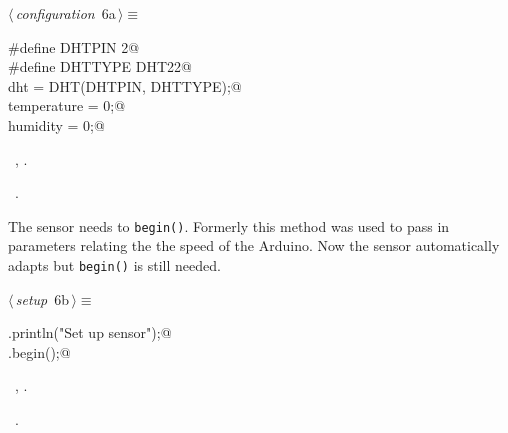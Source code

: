 \documentclass[a4paper, 11pt]{article}
\begin{document}
\begin{flushleft} \small
\begin{minipage}{\linewidth}\label{scrap3}\raggedright\small
{}$\langle\,${\itshape configuration}\nobreak\ {\footnotesize{6a}}$\,\rangle\equiv$
\vspace{-1ex}
\begin{list}{}{\setlength{\leftmargin}{1em}} \item
\mbox{}\lstinline@#define DHTPIN 2@\\
\mbox{}\lstinline@#define DHTTYPE DHT22@\\
\mbox{}\lstinline@DHT dht = DHT(DHTPIN, DHTTYPE);@\\
\mbox{}\lstinline@float temperature = 0;@\\
\mbox{}\lstinline@float humidity = 0;@\\
\mbox{}{\NWsep}
\end{list}
\vspace{-1ex}
\vspace{-1ex}
\footnotesize
\begin{list}{}{\setlength{\itemsep}{-\parsep}\setlength{\itemindent}{-\leftmargin}}
\item \NWtxtMacroDefBy\ , .
\item \NWtxtMacroRefIn\ .
\end{list}
\end{minipage}
\end{flushleft}

The sensor needs to \verb|begin()|.
Formerly this method was used to pass in parameters relating the the speed of the Arduino.
Now the sensor automatically adapts
but \verb|begin()| is still needed.

\begin{flushleft} \small
\begin{minipage}{\linewidth}\label{scrap4}\raggedright\small
{}$\langle\,${\itshape setup}\nobreak\ {\footnotesize{6b}}$\,\rangle\equiv$
\vspace{-1ex}
\begin{list}{}{\setlength{\leftmargin}{1em}} \item
\mbox{}\lstinline@Serial.println("Set up sensor");@\\
\mbox{}\lstinline@dht.begin();@\\
\mbox{}{\NWsep}
\end{list}
\vspace{-1ex}
\vspace{-1ex}
\footnotesize
\begin{list}{}{\setlength{\itemsep}{-\parsep}\setlength{\itemindent}{-\leftmargin}}
\item \NWtxtMacroDefBy\ , .
\item \NWtxtMacroRefIn\ .
\end{list}
\end{minipage}
\end{flushleft}
\end{document}
